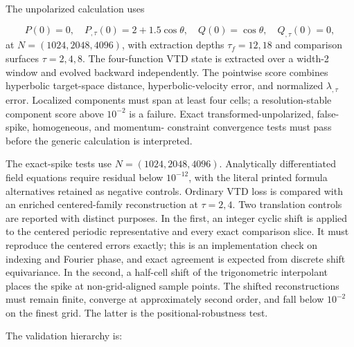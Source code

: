 \documentclass{iopjournal}
\begin{document}
The unpolarized calculation uses

\[
P(0)=0,\quad P_{,\tau}(0)=2+1.5\cos\theta,
\quad Q(0)=\cos\theta,\quad Q_{,\tau}(0)=0,
\]
at $N=(1024,2048,4096)$, with extraction depths $\tau_f=12,18$ and comparison surfaces $\tau=2,4,8$. The four-function VTD state is extracted over a width-2 window and evolved backward independently. The pointwise score combines hyperbolic target-space distance, hyperbolic-velocity error, and normalized $\lambda_{,\tau}$ error. Localized components must span at least four cells; a resolution-stable component score above $10^{-2}$ is a failure. Exact transformed-unpolarized, false-spike, homogeneous, and momentum- constraint convergence tests must pass before the generic calculation is interpreted.

The exact-spike tests use $N=(1024,2048,4096)$. Analytically differentiated field equations require residual below $10^{-12}$, with the literal printed formula alternatives retained as negative controls. Ordinary VTD loss is compared with an enriched centered-family reconstruction at $\tau=2,4$. Two translation controls are reported with distinct purposes. In the first, an integer cyclic shift is applied to the centered periodic representative and every exact comparison slice. It must reproduce the centered errors exactly; this is an implementation check on indexing and Fourier phase, and exact agreement is expected from discrete shift equivariance. In the second, a half-cell shift of the trigonometric interpolant places the spike at non-grid-aligned sample points. The shifted reconstructions must remain finite, converge at approximately second order, and fall below $10^{-2}$ on the finest grid. The latter is the positional-robustness test.

The validation hierarchy is:
\end{document}
